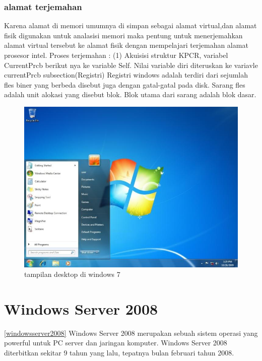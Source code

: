 		\subsubsection{alamat terjemahan}
			Karena alamat di memori umumnya di simpan sebagai alamat virtual,dan 
			alamat fisik digunakan untuk analasisi memori maka pentung untuk 
			menerjemahkan alamat virtual tersebut ke alamat fisik dengan 
			mempelajari terjemahan alamat prosesor intel. Proses terjemahan :  
			(1) Akuisisi struktur KPCR, variabel CurrentPrcb berikut nya ke 
			variable Self. Nilai variable diri diteruskan ke variavle currentPrcb 
			subsection(Registri)
			Registri windows adalah terdiri dari sejumlah fles biner yang berbeda 
			disebut juga dengan gatal-gatal pada disk. Sarang fles adalah unit 
			alokasi yang disebut blok. Blok utama dari sarang adalah blok dasar.

\cite{zhang2010exploratory} 

\begin{figure}[ht]
\centerline{\includegraphics[width=1\textwidth]{figures/desktop7.JPG}}
\caption{tampilan desktop di windows 7}
\label{desktop7}
\end{figure}

	\section{Windows Server 2008}
\ref{windowsserver2008}
	Windows Server 2008 merupakan sebuah sistem operasi yang powerful untuk PC server dan jaringan komputer. Windows Server 2008 diterbitkan sekitar 9 tahun yang lalu, tepatnya bulan februari tahun 2008.\cite{wahyono2009practice}
